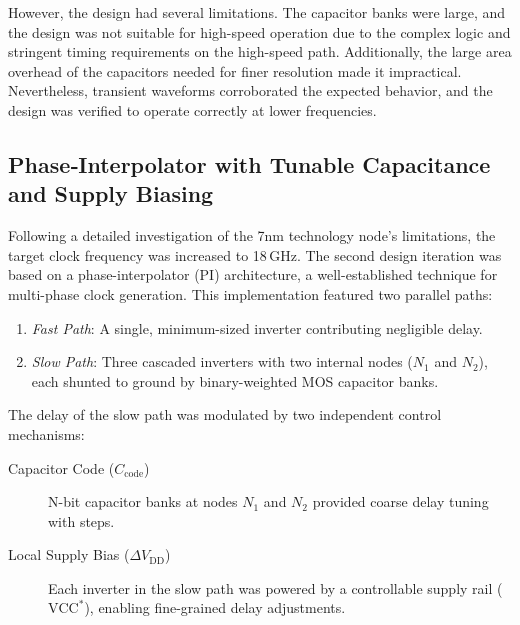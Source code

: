 However, the design had several limitations. The capacitor banks were large, and the design was not suitable for high-speed operation due to the complex logic and stringent timing requirements on the high-speed path. Additionally, the large area overhead of the capacitors needed for finer resolution made it impractical. Nevertheless, transient waveforms corroborated the expected behavior, and the design was verified to operate correctly at lower frequencies.

\subsection{Phase‑Interpolator with Tunable Capacitance and Supply Biasing}\label{sec:pi_cap_supply}

Following a detailed investigation of the 7nm technology node's limitations, the target clock frequency was increased to 18\,GHz. The second design iteration was based on a phase-interpolator (PI) architecture, a well-established technique for multi-phase clock generation. This implementation featured two parallel paths:

\begin{enumerate}
  \item \emph{Fast Path}: A single, minimum-sized inverter contributing negligible delay.
  \item \emph{Slow Path}: Three cascaded inverters with two internal nodes ($N_1$ and $N_2$), each shunted to ground by binary-weighted MOS capacitor banks.
\end{enumerate}

The delay of the slow path was modulated by two independent control mechanisms:
\begin{description}
  \item[Capacitor Code ($C_\text{code}$)] N-bit capacitor banks at nodes $N_1$ and $N_2$ provided coarse delay tuning with steps.
  \item[Local Supply Bias ($\Delta V_\text{DD}$)] Each inverter in the slow path was powered by a controllable supply rail ($\text{VCC}^*$), enabling fine-grained delay adjustments.
\end{description}

